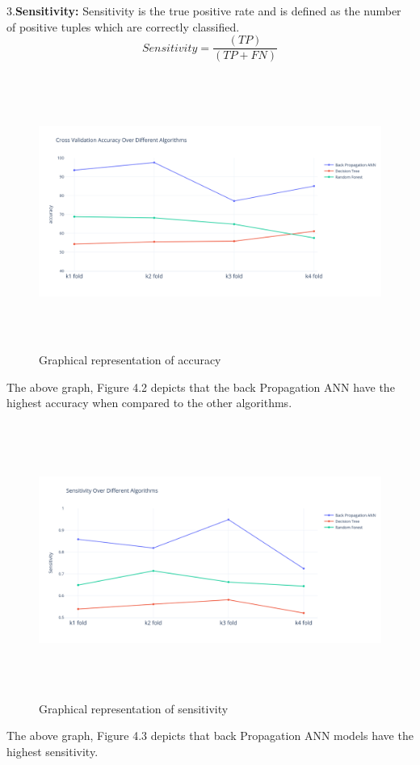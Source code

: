 3.\textbf{Sensitivity:} Sensitivity  is  the  true  positive  rate  and  is  defined  as  the number of positive tuples which are correctly classified.
 \[ Sensitivity=  \frac{(TP)}{(TP+FN)} \]
 

 
\begin{figure}[H]
\begin{center}
\includegraphics[width=150mm,height=90mm]{comparisonnew/accuracy.png}
 \caption{Graphical representation of accuracy}
 \end{center}                
\end{figure}
The above graph, Figure 4.2 depicts that the back Propagation ANN  have  the  highest  accuracy  when  compared  to  the other algorithms.


\begin{figure}[H]
\begin{center}
\includegraphics[width=150mm,height=90mm]{comparisonnew/sensitivity.png}
 \caption{Graphical representation of sensitivity}
 \end{center}                
\end{figure}
The   above   graph, Figure 4.3 depicts  that    back Propagation ANN  models  have the highest sensitivity.

